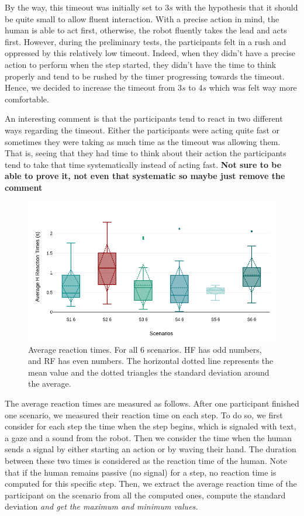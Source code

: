 By the way, this timeout was initially set to 3$s$ with the hypothesis that it should be quite small to allow fluent interaction. With a precise action in mind, the human is able to act first, otherwise, the robot fluently takes the lead and acts first. However, during the preliminary tests, the participants felt in a rush and oppressed by this relatively low timeout. Indeed, when they didn't have a precise action to perform when the step started, they didn't have the time to think properly and tend to be rushed by the timer progressing towards the timeout. Hence, we decided to increase the timeout from 3$s$ to 4$s$ which was felt way more comfortable. 

An interesting comment is that the participants tend to react in two different ways regarding the timeout. Either the participants were acting quite fast or sometimes they were taking as much time as the timeout was allowing them. That is, seeing that they had time to think about their action the participants tend to take that time systematically instead of acting fast. \textbf{Not sure to be able to prove it, not even that systematic so maybe just remove the comment}

\begin{figure}
    \centering
    \includegraphics[width=\linewidth]{images/Chapter5/av_reaction_times.png}
    \caption{Average reaction times. For all 6 scenarios. HF has odd numbers, and RF has even numbers. The horizontal dotted line represents the mean value and the dotted triangles the standard deviation around the average.}
    \label{fig:h_reaction_time}
\end{figure}

The average reaction times are measured as follows. After one participant finished one scenario, we measured their reaction time on each step. To do so, we first consider for each step the time when the step begins, which is signaled with text, a gaze and a sound from the robot. Then we consider the time when the human sends a signal by either starting an action or by waving their hand. The duration between these two times is considered as the reaction time of the human. Note that if the human remains passive (no signal) for a step, no reaction time is computed for this specific step. Then, we extract the average reaction time of the participant on the scenario from all the computed ones, compute the standard deviation \textit{and get the maximum and minimum values.}


